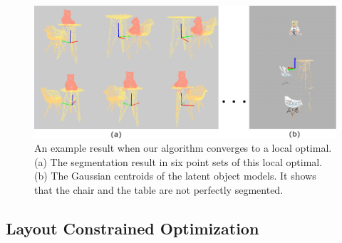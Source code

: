 \begin{figure}
	\centering
	\includegraphics[width=\linewidth]{images/localoptimal/localoptimal}
	\caption{\label{fig:localoptimal} An example result when our algorithm converges to a local optimal. (a) The segmentation result in six point sets of this local optimal. (b) The Gaussian centroids of the latent object models. It shows that the chair and the table are not perfectly segmented. }
\end{figure}



\subsection{Layout Constrained Optimization}
\label{subsec:optimzation}

